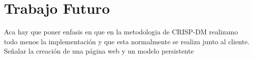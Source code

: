 \chapter{Trabajo Futuro}
\label{ch:trafu}
Aca hay que poner enfasis en que en la metodologia de CRISP-DM realizamo todo menos la implementación y que esta normalmente se realiza junto al cliente. Señalar la creación de una página web y un modelo persistente 